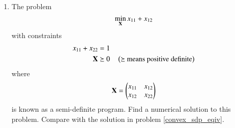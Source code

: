 \renewcommand{\theequation}{\theenumi}
\begin{enumerate}[label=\arabic*.,ref=\thesubsection.\theenumi]

\item
%
\label{ch3_convex_ch2}
The problem
\begin{equation}
\min_{\mathbf{X}} x_{11} + x_{12}
\end{equation}
%	
with constraints
\begin{align}
x_{11} + x_{22} &= 1 \\	
\mathbf{X}
& \succeq 0 \quad  \left(\text{$\succeq$ means positive definite}\right)
\end{align}
%
where
\begin{equation}
\mathbf{X}=
\begin{pmatrix}
x_{11} & x_{12} \\
x_{12} & x_{22}
\end{pmatrix} 
\end{equation}
%
is known as a semi-definite program.  Find a numerical solution to this problem. Compare with the solution 
in problem  \ref{convex_sdp_eqiv}.
\label{prob:cvxopt}


\end{enumerate}
